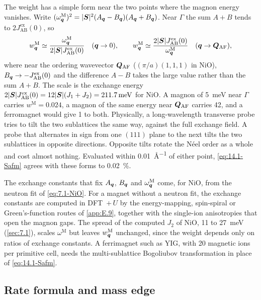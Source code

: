The weight has a simple form near the two points where the magnon energy vanishes. Write $(\omega^{\mathrm{M}}_{\bm{q}})^2 = |\bm{S}|^2(A_{\bm{q}} - B_{\bm{q}})(A_{\bm{q}} + B_{\bm{q}})$. Near $\Gamma$ the sum $A + B$ tends to $2J^{\mathrm{ex}}_{\mathrm{AB}}(0)$, so
\begin{equation*}
  w^{\mathrm{M}}_{\bm{q}} \simeq \frac{\omega^{\mathrm{M}}_{\bm{q}}}{2|\bm{S}|J^{\mathrm{ex}}_{\mathrm{AB}}(0)} \quad (\bm{q} \to 0), \qquad
  w^{\mathrm{M}}_{\bm{q}} \simeq \frac{2|\bm{S}|J^{\mathrm{ex}}_{\mathrm{AB}}(0)}{\omega^{\mathrm{M}}_{\bm{q}}} \quad (\bm{q} \to \bm{Q}_{\mathrm{AF}}) ,
\end{equation*}
where near the ordering wavevector $\bm{Q}_{\mathrm{AF}}$ ($(\pi/a)(1,1,1)$ in NiO), $B_{\bm{q}} \to -J^{\mathrm{ex}}_{\mathrm{AB}}(0)$ and the difference $A - B$ takes the large value rather than the sum $A + B$. The scale is the exchange energy $2|\bm{S}|J^{\mathrm{ex}}_{\mathrm{AB}}(0) = 12|\bm{S}|(J_1 + J_2) = \SI{211.7}{meV}$ for NiO. A magnon of \SI{5}{meV} near $\Gamma$ carries $w^{\mathrm{M}} = 0.024$, a magnon of the same energy near $\bm{Q}_{\mathrm{AF}}$ carries 42, and a ferromagnet would give 1 to both. Physically, a long-wavelength transverse probe tries to tilt the two sublattices the same way, against the full exchange field. A probe that alternates in sign from one $(111)$ plane to the next tilts the two sublattices in opposite directions. Opposite tilts rotate the Néel order as a whole and cost almost nothing. Evaluated within \SI{0.01}{\angstrom^{-1}} of either point, \cref{eq:14.1-Safm} agrees with these forms to \SI{0.02}{\percent}.

The exchange constants that fix $A_{\bm{q}}$, $B_{\bm{q}}$ and $\omega^{\mathrm{M}}_{\bm{q}}$ come, for NiO, from the neutron fit of \cref{eq:7.1-NiO}. For a magnet without a neutron fit, the exchange constants are computed in DFT~$+\,U$ by the energy-mapping, spin-spiral or Green's-function routes of \cref{app:E.9}, together with the single-ion anisotropies that open the magnon gaps. The spread of the computed $J_2$ of NiO, 11 to \SI{27}{meV} (\cref{sec:7.1}), scales $\omega^{\mathrm{M}}$ but leaves $w^{\mathrm{M}}_{\bm{q}}$ unchanged, since the weight depends only on ratios of exchange constants. A ferrimagnet such as YIG, with 20 magnetic ions per primitive cell, needs the multi-sublattice Bogoliubov transformation in place of \cref{eq:14.1-Safm}.

\subsection{Rate formula and mass edge}

